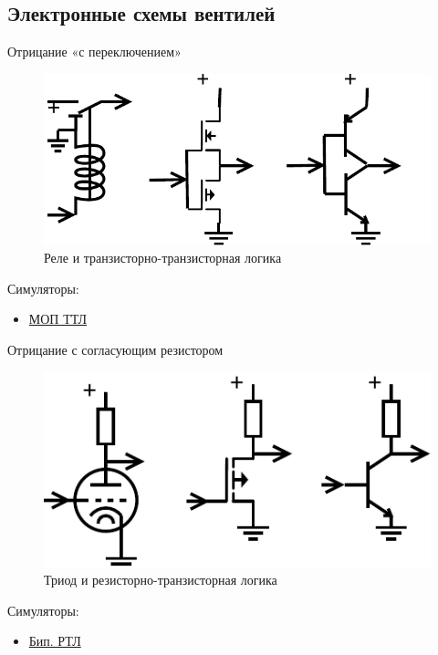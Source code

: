 \documentclass[xetex,aspectratio=43]{beamer}
\begin{document}
\subsection{Электронные схемы вентилей}

\begin{frame}{Отрицание «с переключением»}
    \begin{figure}
        \includegraphics[height=0.5\textheight]{img/07.not_switch.pdf}
        \caption{Реле и транзисторно-транзисторная логика}
    \end{figure}
    Симуляторы:
    \begin{itemize}
        \item \href{https://www.falstad.com/circuit/e-cmosinverter.html}{МОП ТТЛ}
    \end{itemize}
\end{frame}

\begin{frame}{Отрицание с согласующим резистором}
    \begin{figure}
        \includegraphics[height=0.5\textheight]{img/07.not_resist.pdf}
        \caption{Триод и резисторно-транзисторная логика}
    \end{figure}
    Симуляторы:
    \begin{itemize}
        \item \href{https://www.falstad.com/circuit/e-rtlinverter.html}{Бип. РТЛ}
    \end{itemize}
\end{frame}
\end{document}
